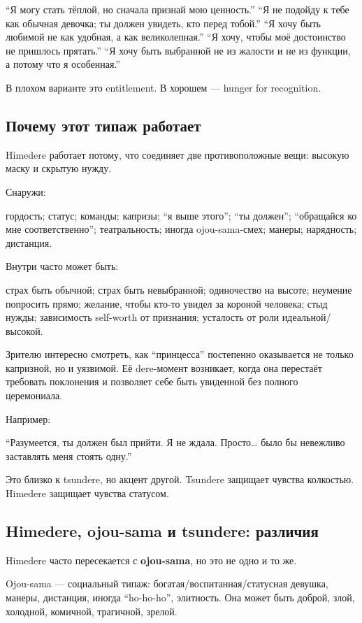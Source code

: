 ``Я могу стать тёплой, но сначала признай мою ценность.'' ``Я не подойду
к тебе как обычная девочка; ты должен увидеть, кто перед тобой.'' ``Я
хочу быть любимой не как удобная, а как великолепная.'' ``Я хочу, чтобы
моё достоинство не пришлось прятать.'' ``Я хочу быть выбранной не из
жалости и не из функции, а потому что я особенная.''

В плохом варианте это entitlement. В хорошем --- hunger for recognition.

\subsection*{Почему этот типаж работает}

Himedere работает потому, что соединяет две противоположные вещи:
высокую маску и скрытую нужду.

Снаружи:

гордость; статус; команды; капризы; ``я выше этого''; ``ты должен'';
``обращайся ко мне соответственно''; театральность; иногда
ojou-sama-смех; манеры; нарядность; дистанция.

Внутри часто может быть:

страх быть обычной; страх быть невыбранной; одиночество на высоте;
неумение попросить прямо; желание, чтобы кто-то увидел за короной
человека; стыд нужды; зависимость self-worth от признания; усталость от
роли идеальной/\hspace{0pt}высокой.

Зрителю интересно смотреть, как ``принцесса'' постепенно оказывается не
только капризной, но и уязвимой. Её dere-момент возникает, когда она
перестаёт требовать поклонения и позволяет себе быть увиденной без
полного церемониала.

Например:

``Разумеется, ты должен был прийти. Я не ждала. Просто\ldots{} было бы
невежливо заставлять меня стоять одну.''

Это близко к tsundere, но акцент другой. Tsundere защищает чувства
колкостью. Himedere защищает чувства статусом.

\subsection*{Himedere, ojou-sama и tsundere: различия}

Himedere часто пересекается с \textbf{ojou-sama}, но это не одно и то
же.

Ojou-sama --- социальный типаж: богатая/\hspace{0pt}воспитанная/\hspace{0pt}статусная девушка,
манеры, дистанция, иногда ``ho-ho-ho'', элитность. Она может быть
доброй, злой, холодной, комичной, трагичной, зрелой.

